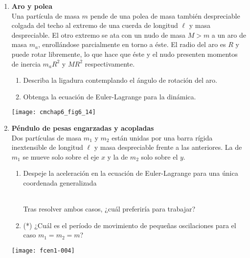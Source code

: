 \documentclass[11pt, spanish, a4paper, twoside]{article}
\begin{document}
\begin{enumerate}
\item 
\begin{minipage}[t][4.5cm]{0.75\textwidth}
\textbf{Aro y polea}\\
	Una partícula de masa \(m\) pende de una polea de masa también despreciable colgada del techo al extremo de una cuerda de longitud \(\ell\) y masa despreciable.
	El otro extremo se ata con un nudo de masa \(M> m\) a un aro de masa \(m_a\), enrollándose parcialmente en torno a éste.
	El radio del aro es \(R\) y puede rotar libremente, lo que hace que éste y el nudo presenten momentos de inercia \(m_a R^2\) y \(M R^2\) respectivamente.
	\begin{enumerate}
		\item Describa la ligadura contemplando el ángulo de rotación del aro.
		\item Obtenga la ecuación de Euler-Lagrange para la dinámica.
\end{enumerate}
\end{minipage}
\begin{minipage}[c][0cm][t]{0.2\textwidth}
	\texttt{[image: cmchap6\_fig6\_14]}
\end{minipage}


\item 
\begin{minipage}[t][5.5cm]{0.7\textwidth}
	\textbf{Péndulo de pesas engarzadas y acopladas}\\ 
	Dos partículas de masa \(m_1\) y \(m_2\) están unidas por una barra rígida inextensible de longitud \(\ell\) y masa despreciable frente a las anteriores.
	La de \(m_1\) se mueve solo sobre el eje \(x\) y la de \(m_2\) solo sobre el \(y\).
\begin{enumerate}
	\item Despeje la aceleración en la ecuación de Euler-Lagrange para una única coordenada generalizada\\
	\\ %
	Tras resolver ambos casos, ¿cuál preferiría para trabajar?
	\item (*) ¿Cuál es el período de movimiento de pequeñas oscilaciones para el caso \(m_1 = m_2 = m\)?
\end{enumerate}
\end{minipage}
\begin{minipage}[c][0cm][t]{0.3\textwidth}
	\texttt{[image: fcen1-004]}
\end{minipage}



\end{enumerate}
\end{document}
